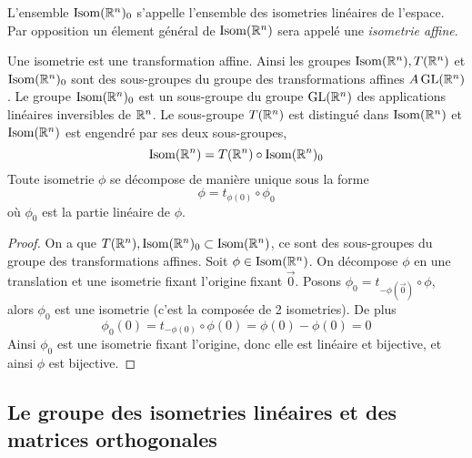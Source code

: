 \begin{definition}
	L'ensemble $\operatorname{Isom}(\mathbb{R}^n)_0$ s'appelle l'ensemble des isometries linéaires de
	l'espace. Par opposition un élement général de $\operatorname{Isom}(\mathbb{R}^n)$ sera appelé une
	\emph{isometrie affine}.
\end{definition}

\begin{theorem}
	Une isometrie est une transformation affine. Ainsi les groupes
	$\operatorname{Isom}(\mathbb{R}^n), T(\mathbb{R}^n)$ et $\operatorname{Isom}(\mathbb{R}^n)_0$ sont des sous-groupes du groupe des
	transformations affines $A\operatorname{GL}(\mathbb{R}^n)$. Le groupe $\operatorname{Isom}(\mathbb{R}^n)_0$ est un
	sous-groupe du groupe $\operatorname{GL}(\mathbb{R}^n)$ des applications linéaires inversibles de
	$\mathbb{R}^n$. Le sous-groupe $T(\mathbb{R}^n)$ est distingué dans $\operatorname{Isom}(\mathbb{R}^n)$ et
	$\operatorname{Isom}(\mathbb{R}^n)$ est engendré par ses deux sous-groupes,
	\begin{equation*}
		\operatorname{Isom}(\mathbb{R}^n) = T(\mathbb{R}^n) \circ \operatorname{Isom}(\mathbb{R}^n)_0
	\end{equation*}
	Toute isometrie $\phi$ se décompose de manière unique sous la forme
	\begin{equation*}
		\phi = t_{\phi(0)} \circ \phi_0
	\end{equation*}
	où $\phi_0$ est la partie linéaire de $\phi$.
\end{theorem}

\begin{proof}
	On a que $T(\mathbb{R}^n), \operatorname{Isom}(\mathbb{R}^n)_0 \subset \operatorname{Isom}(\mathbb{R}^n)$, ce sont des
	sous-groupes du groupe des transformations affines.
	Soit $\phi\in\operatorname{Isom}(\mathbb{R}^n)$. On décompose $\phi$ en une translation et une
	isometrie fixant l'origine fixant $\vec{0}$.
	Posons $\phi_0 = t_{-\phi(\vec{0})} \circ \phi$, alors $\phi_0$ est une
	isometrie (c'est la composée de 2 isometries). De plus
	\begin{equation*}
		\phi_0(0) = t_{-\phi(0)} \circ \phi(0) = \phi(0) - \phi(0) = 0
	\end{equation*}
	Ainsi $\phi_0$ est une isometrie fixant l'origine, donc elle est linéaire et
	bijective, et ainsi $\phi$ est bijective.
\end{proof}

\subsection{Le groupe des isometries linéaires et des matrices orthogonales}

